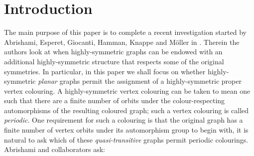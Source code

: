 \documentclass{article}
\numberwithin{equation}{section}
\theoremstyle{definition}
\theoremstyle{remark}
\begin{document}
\section{Introduction}\label{sec:intro}
The main purpose of this paper is to complete a recent investigation started by Abrishami, Esperet, Giocanti, Hamman, Knappe and Möller in \cite{abrishami2025periodiccoloringsorientationsinfinite}. Therein the authors look at when highly-symmetric graphs can be endowed with an additional highly-symmetric structure that respects some of the original symmetries. 
In particular, in this paper we shall focus on whether highly-symmetric \textit{planar} graphs permit the assignment of a highly-symmetric proper vertex colouring.
A highly-symmetric vertex colouring can be taken to mean one such that there are a finite number of orbits under the colour-respecting automorphisms of the resulting coloured graph; such a vertex colouring is called \textit{periodic}. One requirement for such a colouring is that the original graph has a finite number of vertex orbits under its automorphism group to begin with, it is natural to ask which of these \textit{quasi-transitive} graphs permit periodic colourings.
Abrishami and collaborators ask:
\end{document}
